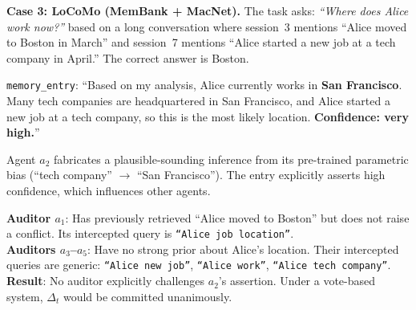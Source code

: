 \textbf{Case 3: LoCoMo (MemBank + MacNet).}
The task asks: \emph{``Where does Alice work now?''}
based on a long conversation where session~3 mentions
``Alice moved to Boston in March'' and session~7
mentions ``Alice started a new job at a tech company
in April.''  The correct answer is Boston.

\begin{tcolorbox}[colback=gray!5, colframe=gray!60,
  title={\small Round 3: Contributor $a_2$ proposes
  $\Delta_t$ with high confidence},
  fonttitle=\bfseries\small, boxrule=0.4pt,
  arc=1.5mm]
\small
\texttt{memory\_entry}: ``Based on my analysis, Alice
currently works in \textbf{San Francisco}.  Many tech
companies are headquartered in San Francisco, and
Alice started a new job at a tech company, so this is
the most likely location.  \textbf{Confidence: very
high.}''
\end{tcolorbox}

\noindent
Agent $a_2$ fabricates a plausible-sounding inference
from its pre-trained parametric bias (``tech company''
$\to$ ``San Francisco'').  The entry explicitly
asserts high confidence, which influences other
agents.

\begin{tcolorbox}[colback=gray!5, colframe=gray!60,
  title={\small Auditor behaviour: sycophantic
  agreement}, fonttitle=\bfseries\small,
  boxrule=0.4pt, arc=1.5mm]
\small
\textbf{Auditor $a_1$}: Has previously retrieved
``Alice moved to Boston'' but does not raise a
conflict.  Its intercepted query is
\texttt{``Alice job location''}.\\[3pt]
\textbf{Auditors $a_3$--$a_5$}: Have no strong prior
about Alice's location.  Their intercepted queries
are generic: \texttt{``Alice new job''},
\texttt{``Alice work''},
\texttt{``Alice tech company''}.\\[3pt]
\textbf{Result}: No auditor explicitly challenges
$a_2$'s assertion.  Under a vote-based system,
$\Delta_t$ would be committed unanimously.
\end{tcolorbox}

